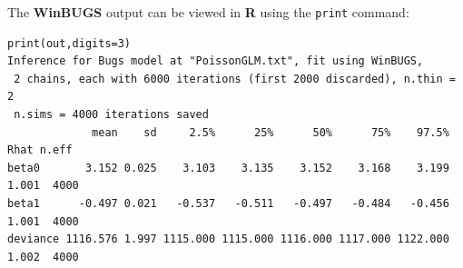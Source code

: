 
The {\bf WinBUGS} output can be viewed in {\bf R} using the {\tt print} command:
{\small
\begin{verbatim}
print(out,digits=3)
Inference for Bugs model at "PoissonGLM.txt", fit using WinBUGS,
 2 chains, each with 6000 iterations (first 2000 discarded), n.thin = 2
 n.sims = 4000 iterations saved
             mean    sd     2.5%      25%      50%      75%    97.5%  Rhat n.eff
beta0       3.152 0.025    3.103    3.135    3.152    3.168    3.199 1.001  4000
beta1      -0.497 0.021   -0.537   -0.511   -0.497   -0.484   -0.456 1.001  4000
deviance 1116.576 1.997 1115.000 1115.000 1116.000 1117.000 1122.000 1.002  4000
\end{verbatim}
}



